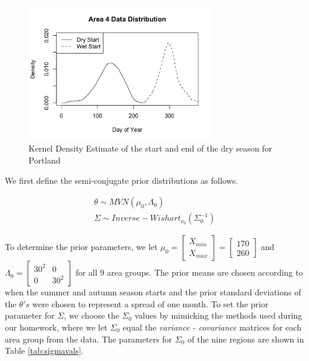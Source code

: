 \documentclass{article}
\begin{document}
\begin{figure}[H]
\includegraphics[width = .4\textwidth, height = 6cm]{Area4DataDistribution}
\caption{Kernel Density Estimate of the start and end of the dry season for Portland}
\label{PDXexample}
\end{figure}

We first define the semi-conjugate prior distributions as follows. 

\begin{align*}
\theta \sim MVN(\mu_0, \Lambda_0) \\
\Sigma \sim Inverse-Wishart_{\nu_0}(\Sigma_0^{-1})
\end{align*}

To determine the prior parameters, we let $\mu_0 = \begin{bmatrix} X_{min} \\ X_{max} \end{bmatrix} = \begin{bmatrix} 170 \\ 260 \end{bmatrix}$ and $\Lambda_0 = \begin{bmatrix} 30^2 & 0 \\ 0 & 30^2 \end{bmatrix}$ for all 9 area groups. The prior means are chosen according to when the summer and autumn season starts and the prior standard deviations of the $\theta 's$ were chosen to represent a spread of one month. To set the prior parameter for $\Sigma$, we choose the $\Sigma_0$ values by mimicking the methods used during our homework, where we let $\Sigma_0$ equal the \textit{variance - covariance} matrices for each area group from the data. The parameters for $\Sigma_0$ of the nine regions are shown in Table \ref{tab:sigmavals}.
\end{document}
